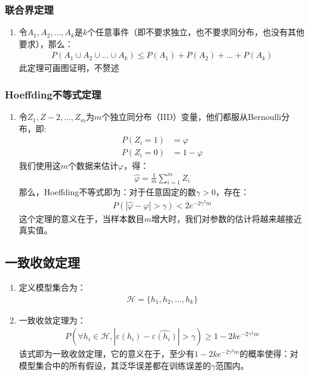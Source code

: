 \subsubsection{联合界定理}
\begin{enumerate}
	\item 令$A_1, A_2, \dots, A_k$是$k$个任意事件（即不要求独立，也不要求同分布，也没有其他要求），那么：
	\begin{align}
		P(A_1 \cup A_2 \cup \dots \cup A_k) \leq P(A_1) + P(A_2) + \dots + P(A_k)
	\end{align}
	此定理可画图证明，不赘述
\end{enumerate}

\subsubsection{Hoeffding不等式定理}
\begin{enumerate}
	\item 令$Z_1, Z-2, \dots, Z_m$为$m$个独立同分布（IID）变量，他们都服从Bernoulli分布，即:
	\begin{align}
		P(Z_i = 1) &= \varphi \\
		P(Z_i = 0) &= 1 - \varphi
	\end{align}
	我们使用这$m$个数据来估计$\varphi$，得：
	\begin{align}
		\hat{\varphi} = \frac{1}{m}\sum_{i=1}^{m}Z_i
	\end{align}
	那么，Hoeffding不等式即为：对于任意固定的数$\gamma > 0$，存在：
	\begin{align}
		P(|\hat{\varphi} - \varphi| > \gamma) < 2e^{-2\gamma^2 m}
	\end{align}
	这个定理的意义在于，当样本数目$m$增大时，我们对参数的估计将越来越接近真实值。
\end{enumerate}


\subsection{一致收敛定理}
\begin{enumerate}
	\item 定义模型集合为：
	\begin{align}
		\mathcal{H} = \{h_1, h_2, \dots, h_k\}
	\end{align}
	\item 一致收敛定理为：\\
	\begin{align}
		P(\forall h_i \in \mathcal{H}, |\varepsilon(h_i)-\hat{\varepsilon(h_i)}|>\gamma) \geq 1- 2ke^{-2\gamma^2 m}
	\end{align}
	该式即为一致收敛定理，它的意义在于，至少有$1- 2ke^{-2\gamma^2 m}$的概率使得：对模型集合中的所有假设，其泛华误差都在训练误差的$\gamma$范围内。
\end{enumerate}



